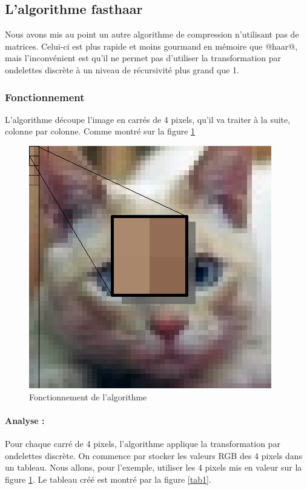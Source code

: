 \documentclass{article}
\begin{document}
\cleardoublepage

\subsection{L'algorithme fasthaar}

Nous avons mis au point un autre algorithme de compression n'utilisant pas de matrices. Celui-ci est plus rapide et moins gourmand en mémoire que @haar@, mais l'inconvénient est qu'il ne permet pas d'utiliser la transformation par ondelettes discrète à un niveau de récursivité plus grand que 1.

\subsubsection{Fonctionnement}

L'algorithme découpe l'image en carrés de 4 pixels, qu'il va traiter à la suite, colonne par colonne. Comme montré sur la figure \ref{algo}

\begin{figure}[!h]
\centering
\includegraphics[scale=0.8]{minichat.jpg}
\caption{Fonctionnement de l'algorithme}
\label{algo}
\end{figure}

\paragraph{Analyse :}

Pour chaque carré de 4 pixels, l'algorithme applique la transformation par ondelettes discrète. On commence par stocker les valeurs RGB des 4 pixels dans un tableau. Nous allons, pour l'exemple, utiliser les 4 pixels mis en valeur sur la figure \ref{algo}. Le tableau créé est montré par la figure \ref{tab1}.
\end{document}
